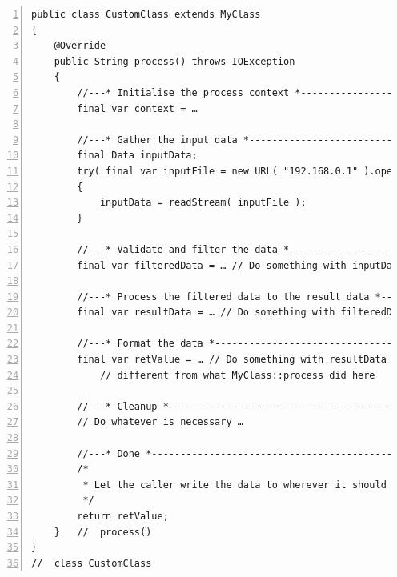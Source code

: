 \documentclass[11pt,a4paper, titlepage, parskip=half, headsepline, footsepline, cleardoublepage=current, headheight=1cm]{scrbook}
\begin{document}
\begin{lstlisting}[numbers=left]
public class CustomClass extends MyClass
{
    @Override
    public String process() throws IOException
    {
        //---* Initialise the process context *----------------------
        final var context = …
        
        //---* Gather the input data *-------------------------------
        final Data inputData;
        try( final var inputFile = new URL( "192.168.0.1" ).openStream() )
        {
            inputData = readStream( inputFile );
        }
        
        //---* Validate and filter the data *------------------------
        final var filteredData = … // Do something with inputData
        
        //---* Process the filtered data to the result data *--------
        final var resultData = … // Do something with filteredData
        
        //---* Format the data *-------------------------------------
        final var retValue = … // Do something with resultData that's
            // different from what MyClass::process did here
        
        //---* Cleanup *---------------------------------------------
        // Do whatever is necessary …
        
        //---* Done *------------------------------------------------
        /*
         * Let the caller write the data to wherever it should end up.
         */
        return retValue; 
    }   //  process()
}
//  class CustomClass
\end{lstlisting}
\end{document}
